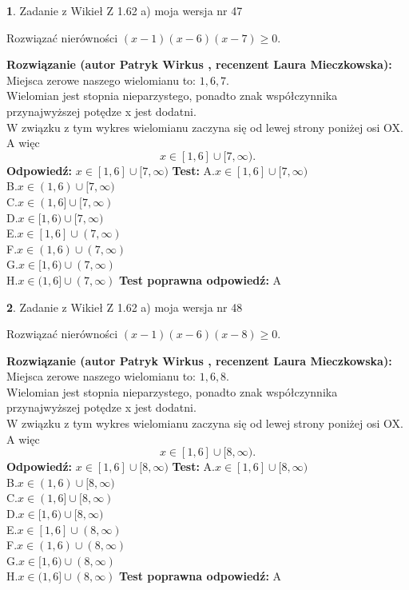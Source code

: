 \documentclass[12pt, a4paper]{article}
\theoremstyle{definition} %
\newtheorem{zad}{}
\newcommand{\zadStart}[1]{\begin{zad}#1\newline}
\newcommand{\zadStop}{\end{zad}}
\newcommand{\rozwStart}[2]{\noindent \textbf{Rozwiązanie (autor #1 , recenzent #2): }\newline}
\newcommand{\rozwStop}{\newline}
\newcommand{\odpStart}{\noindent \textbf{Odpowiedź:}\newline}
\newcommand{\odpStop}{\newline}
\newcommand{\testStart}{\noindent \textbf{Test:}\newline}
\newcommand{\testStop}{\newline}
\newcommand{\kluczStart}{\noindent \textbf{Test poprawna odpowiedź:}\newline}
\newcommand{\kluczStop}{\newline}
\begin{document}
\zadStart{Zadanie z Wikieł Z 1.62 a) moja wersja nr 47}

Rozwiązać nierówności $(x-1)(x-6)(x-7)\ge0$.
\zadStop
\rozwStart{Patryk Wirkus}{Laura Mieczkowska}
Miejsca zerowe naszego wielomianu to: $1, 6, 7$.\\
Wielomian jest stopnia nieparzystego, ponadto znak współczynnika przy\linebreak najwyższej potędze x jest dodatni.\\ W związku z tym wykres wielomianu zaczyna się od lewej strony poniżej osi OX. A więc $$x \in [1,6] \cup [7,\infty).$$
\rozwStop
\odpStart
$x \in [1,6] \cup [7,\infty)$
\odpStop
\testStart
A.$x \in [1,6] \cup [7,\infty)$\\
B.$x \in (1,6) \cup [7,\infty)$\\
C.$x \in (1,6] \cup [7,\infty)$\\
D.$x \in [1,6) \cup [7,\infty)$\\
E.$x \in [1,6] \cup (7,\infty)$\\
F.$x \in (1,6) \cup (7,\infty)$\\
G.$x \in [1,6) \cup (7,\infty)$\\
H.$x \in (1,6] \cup (7,\infty)$
\testStop
\kluczStart
A
\kluczStop



\zadStart{Zadanie z Wikieł Z 1.62 a) moja wersja nr 48}

Rozwiązać nierówności $(x-1)(x-6)(x-8)\ge0$.
\zadStop
\rozwStart{Patryk Wirkus}{Laura Mieczkowska}
Miejsca zerowe naszego wielomianu to: $1, 6, 8$.\\
Wielomian jest stopnia nieparzystego, ponadto znak współczynnika przy\linebreak najwyższej potędze x jest dodatni.\\ W związku z tym wykres wielomianu zaczyna się od lewej strony poniżej osi OX. A więc $$x \in [1,6] \cup [8,\infty).$$
\rozwStop
\odpStart
$x \in [1,6] \cup [8,\infty)$
\odpStop
\testStart
A.$x \in [1,6] \cup [8,\infty)$\\
B.$x \in (1,6) \cup [8,\infty)$\\
C.$x \in (1,6] \cup [8,\infty)$\\
D.$x \in [1,6) \cup [8,\infty)$\\
E.$x \in [1,6] \cup (8,\infty)$\\
F.$x \in (1,6) \cup (8,\infty)$\\
G.$x \in [1,6) \cup (8,\infty)$\\
H.$x \in (1,6] \cup (8,\infty)$
\testStop
\kluczStart
A
\kluczStop
\end{document}
